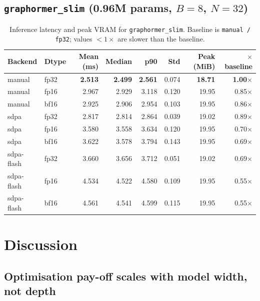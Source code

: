 \documentclass[11pt]{article}
\begin{document}
\subsection{\texttt{graphormer\_slim} (0.96M params, $B{=}8$, $N{=}32$)}

\begin{table}[h!]
\centering
\small
\begin{tabular}{llrrrrrr}
\toprule
\textbf{Backend} & \textbf{Dtype} & \textbf{Mean (ms)} & \textbf{Median} & \textbf{p90} &
\textbf{Std} & \textbf{Peak (MiB)} & \textbf{$\times$ baseline} \\
\midrule
manual     & fp32 & \textbf{2.513} & \textbf{2.499} & \textbf{2.561} & 0.074 & \textbf{18.71} & \textbf{1.00$\times$} \\
manual     & fp16 & 2.967 & 2.929 & 3.118 & 0.120 & 19.95 & 0.85$\times$ \\
manual     & bf16 & 2.925 & 2.906 & 2.954 & 0.103 & 19.95 & 0.86$\times$ \\
sdpa       & fp32 & 2.817 & 2.814 & 2.864 & 0.039 & 19.02 & 0.89$\times$ \\
sdpa       & fp16 & 3.580 & 3.558 & 3.634 & 0.120 & 19.95 & 0.70$\times$ \\
sdpa       & bf16 & 3.622 & 3.578 & 3.794 & 0.143 & 19.95 & 0.69$\times$ \\
sdpa-flash & fp32 & 3.660 & 3.656 & 3.712 & 0.051 & 19.02 & 0.69$\times$ \\
sdpa-flash & fp16 & 4.534 & 4.522 & 4.580 & 0.109 & 19.95 & 0.55$\times$ \\
sdpa-flash & bf16 & 4.561 & 4.541 & 4.599 & 0.115 & 19.95 & 0.55$\times$ \\
\bottomrule
\end{tabular}
\caption{Inference latency and peak VRAM for \texttt{graphormer\_slim}.
Baseline is \texttt{manual / fp32}; values $<\!1\times$ are slower than
the baseline.}
\label{tab:slim}
\end{table}

\section{Discussion}

\subsection{Optimisation pay-off scales with model width, not depth}
\end{document}
